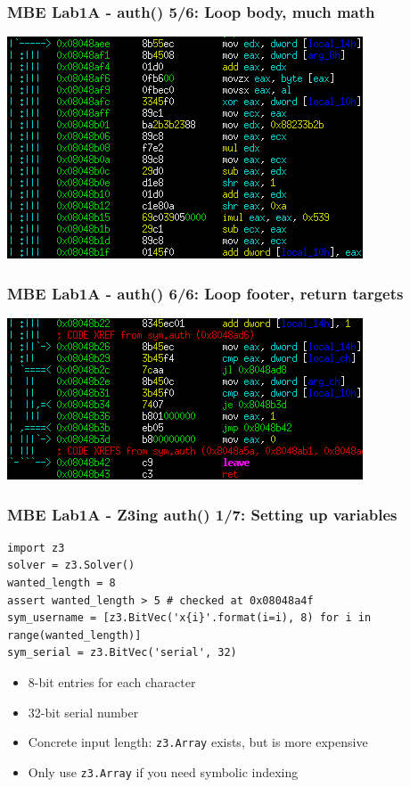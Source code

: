 \documentclass[aspectratio=169]{beamer}
\begin{document}
\begin{frame}[fragile]
\frametitle{MBE Lab1A - auth() 5/6: Loop body, much math}
\includegraphics[width=0.8\paperwidth]{pictures/intel/mbe_lab1a_auth_chunk5.png}
\end{frame}

\begin{frame}[fragile]
\frametitle{MBE Lab1A - auth() 6/6: Loop footer, return targets}
\includegraphics[width=0.9\paperwidth]{pictures/intel/mbe_lab1a_auth_chunk6.png}
\end{frame}

\begin{frame}[fragile]
\frametitle{MBE Lab1A - Z3ing auth() 1/7: Setting up variables}
\begin{Verbatim}[fontsize=\scriptsize, frame=single]
import z3
solver = z3.Solver()
wanted_length = 8
assert wanted_length > 5 # checked at 0x08048a4f
sym_username = [z3.BitVec('x{i}'.format(i=i), 8) for i in range(wanted_length)]
sym_serial = z3.BitVec('serial', 32)
\end{Verbatim}
\begin{itemize}
\item 8-bit entries for each character
\item 32-bit serial number
\item Concrete input length: \verb|z3.Array| exists, but is more expensive
\item Only use \verb|z3.Array| if you need symbolic indexing
\end{itemize}
\end{frame}
\end{document}
